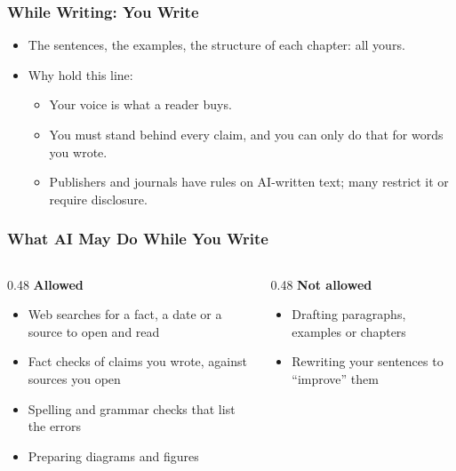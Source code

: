 
\begin{frame}[fragile]\frametitle{While Writing: You Write}
\begin{itemize}
\item The sentences, the examples, the structure of each chapter: all yours.
\item Why hold this line:
\begin{itemize}
    \item Your voice is what a reader buys.
    \item You must stand behind every claim, and you can only do that for words you wrote.
    \item Publishers and journals have rules on AI-written text; many restrict it or require disclosure.
\end{itemize}
\end{itemize}
\end{frame}

\begin{frame}[fragile]\frametitle{What AI May Do While You Write}
\begin{columns}
    \begin{column}[T]{0.48\linewidth}
    \textbf{Allowed}
    \begin{itemize}
    \item Web searches for a fact, a date or a source to open and read
    \item Fact checks of claims you wrote, against sources you open
    \item Spelling and grammar checks that list the errors
    \item Preparing diagrams and figures
    \end{itemize}
    \end{column}
    \begin{column}[T]{0.48\linewidth}
    \textbf{Not allowed}
    \begin{itemize}
    \item Drafting paragraphs, examples or chapters
    \item Rewriting your sentences to ``improve'' them
    \end{itemize}
    \end{column}
\end{columns}
\end{frame}

